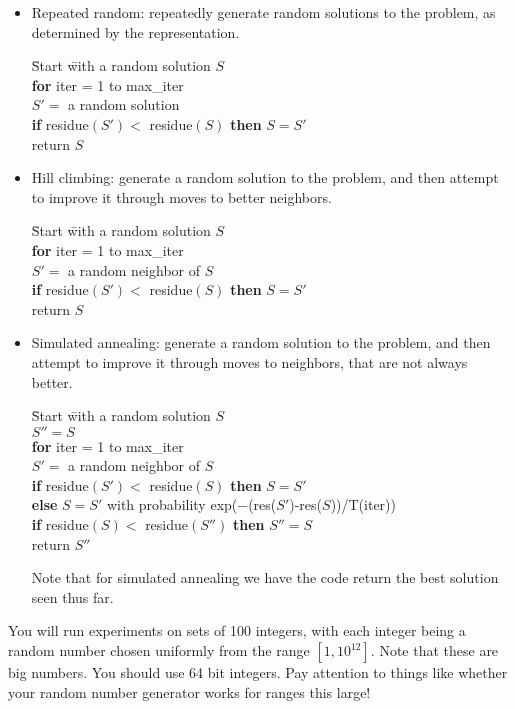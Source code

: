 \documentclass[11pt]{article}
\begin{document}
\begin{itemize}
\item Repeated random:  repeatedly generate random solutions
to the problem, as determined by the representation.
\smallskip
\begin{tabbing}
\quad \quad \quad \= Start \= with a random solution $S$ \\
\> {\bf for} iter = 1 to max\_iter \\
\> \> $S' =$ a random solution \\
\> \> {\bf if} residue$(S') <$ residue$(S)$ {\bf then} $S = S'$ \\
\> return $S$
\end{tabbing}
\smallskip
\item Hill climbing:  generate a random solution to the problem, and
then attempt to improve it through moves to better neighbors.
\smallskip
\begin{tabbing}
\quad \quad \quad \= Start \= with a random solution $S$ \\
\> {\bf for} iter = 1 to max\_iter \\
\> \> $S' =$ a random neighbor of $S$ \\
\> \> {\bf if} residue$(S') <$ residue$(S)$ {\bf then} $S = S'$ \\
\> return $S$
\end{tabbing}
\smallskip
\item Simulated annealing:  generate a random solution to the problem, and
then attempt to improve it through moves to neighbors, that are not always 
better.
\begin{tabbing}
\quad \quad \quad \= Start \= with a random solution $S$ \\
\> $S'' = S$ \\
\> {\bf for} iter = 1 to max\_iter \\
\> \> $S' =$ a random neighbor of $S$ \\
\> \> {\bf if} residue$(S') <$ residue$(S)$ {\bf then} $S = S'$ \\
\> \> {\bf else} $S = S'$ with probability exp($-$(res($S'$)-res($S$))/T(iter))\\
\> \> {\bf if} residue$(S) <$ residue$(S'')$ {\bf then} $S'' = S$ \\
\> return $S''$
\end{tabbing}
\smallskip
Note that for simulated annealing we have the code return the best
solution seen thus far.
\end{itemize}

You will run experiments on sets of 100 integers, with each integer
being a random number chosen uniformly from the range $[1,10^{12}]$.
Note that these are big numbers.  You should use 64 bit integers.  Pay
attention to things like whether your random number generator works for
ranges this large!
\end{document}
